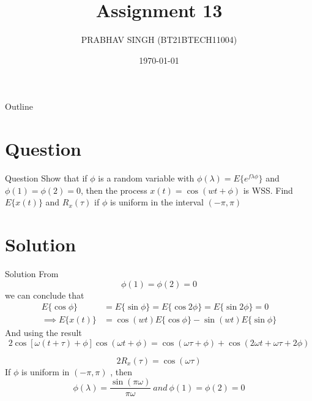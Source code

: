 \documentclass{beamer}
\title{Assignment 13}
\author{PRABHAV SINGH (BT21BTECH11004)}
\date{\today}
\begin{document}
	
	\begin{frame}
		\titlepage 
	\end{frame}
	
	\logo{}
	
	
	\begin{frame}{Outline}
		\tableofcontents
	\end{frame}
	
	\section{Question}
	\begin{frame}{Question}
	Show that if $ {\phi} $ is a random variable with $  \phi(\lambda)=E\{e^{f{\lambda}{\phi}}\} $ and $  {\phi}(1) = {\phi}(2) = 0 $, then the 
	process $ x(t) = \cos(wt+\phi ) $ is WSS. Find $ E\{x(t)\} $ and $ R_{x}({\tau}) $ if $\phi$ is uniform in the interval $ (-\pi,\pi) $
	\end{frame}
	
	
	\section{Solution}
	\begin{frame}{Solution}
		From \begin{equation}
			{\phi}(1) = {\phi}(2) = 0
		\end{equation}   we can conclude that \\
		\begin{align}
			E\{\cos{\phi}\}&=E\{\sin{\phi}\}=E\{\cos2{\phi}\}=E\{\sin2{\phi}\}=0\\
			\implies	 E\{x(t)\}&=\cos(wt)E\{\cos{\phi}\}-\sin(wt)E\{\sin{\phi}\}
		\end{align}
		And using the result \\
		\begin{equation}
			2 \cos [\omega(t +\tau) + \phi] \cos ({\omega}t + \phi) = \cos({\omega}{\tau}+\phi)+\cos(2{\omega}t +{\omega}{\tau} + 2{\phi}) 
		\end{equation}

\end{frame}

\begin{frame}
	\begin{equation}
		2R_{x}({\tau})=\cos({\omega}{\tau})
	\end{equation}
	If $ {\phi} $ is uniform in  $ (-\pi,\pi) $ , then\\
	\begin{equation}
		\phi(\lambda)=\dfrac{\sin({\pi}{\omega})}{{\pi}{\omega}}~ and~ {\phi}(1) = {\phi}(2) = 0
	\end{equation}

\end{frame}
\end{document}
